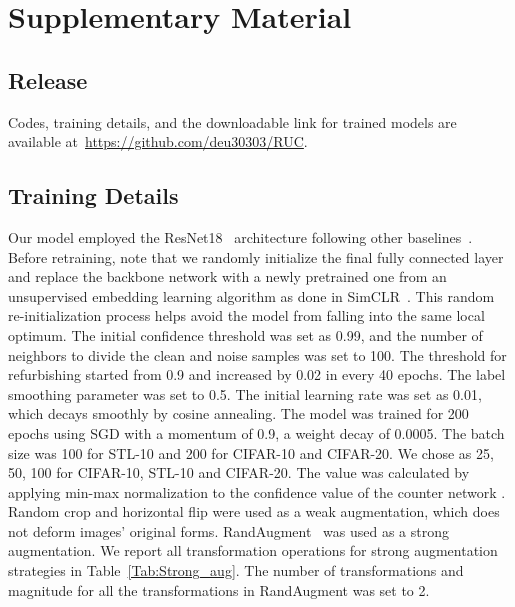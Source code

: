 \documentclass[final]{cvpr}
\begin{document}
{\small


}

\clearpage
\appendix
\section{Supplementary Material}








\subsection{Release}
Codes, training details, and the downloadable link for trained models are available at~\url{https://github.com/deu30303/RUC}.


\subsection{Training Details}
Our model employed the ResNet18~\cite{he2016deep} architecture following other baselines~\cite{hanmitigating,ji2019invariant,van2020scan}. Before retraining, note that we randomly initialize the final fully connected layer and replace the backbone network with a newly pretrained one from an unsupervised embedding learning algorithm as done in SimCLR~\cite{chen2020simple}. This random re-initialization process helps avoid the model from falling into the same local optimum.
The initial confidence threshold  was set as 0.99, and the number of neighbors  to divide the clean and noise samples was set to 100. 
The threshold  for refurbishing started from 0.9 and increased by 0.02 in every 40 epochs. The label smoothing parameter  was set to 0.5.
The initial learning rate was set as 0.01, which decays smoothly by cosine annealing. The model was trained for 200 epochs using SGD with a momentum of 0.9, a weight decay of 0.0005. The batch size was 100 for STL-10 and 200 for CIFAR-10 and CIFAR-20. We chose  as {25, 50, 100} for CIFAR-10, STL-10 and CIFAR-20. The  value was calculated by applying min-max normalization to the confidence value of the counter network .
Random crop and horizontal flip were used as a weak augmentation, which does not deform images' original forms.  RandAugment~\cite{cubuk2020randaugment} was used as a strong augmentation. We report all transformation operations for strong augmentation strategies in Table~\ref{Tab:Strong_aug}. The number of transformations and magnitude for all the transformations in RandAugment was set to 2.  
\end{document}
